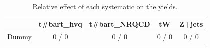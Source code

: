 \documentclass[10pt]{article}
\begin{document}
\begin{table}[htbp]
\begin{center}
\begin{tabular}{|c|c|c|c|c|}
\hline 
      & t#bar{t}_{hvq}      & t#bar{t}_{NRQCD}      & tW      & Z+jets \\ 
\hline 
  Dummy & 0 / 0 & 0 / 0 & 0 / 0 & 0 / 0 \\ 
\hline 
\end{tabular} 
\caption{Relative effect of each systematic on the yields.} 
\end{center} 
\end{table} 
\end{document}
